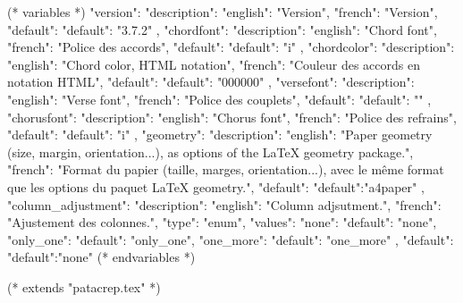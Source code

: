 %
%
%

(* variables *)
{
"version":{ "description": {"english": "Version", "french": "Version"},
            "default": {"default": "3.7.2"}
         },
"chordfont":{ "description": {"english": "Chord font",
                          "french": "Police des accords"},
            "default": {"default": "i"}
         },
"chordcolor":{ "description": {"english": "Chord color, HTML notation",
                          "french": "Couleur des accords en notation HTML"},
            "default": {"default": "000000"}
         },
"versefont":{ "description": {"english": "Verse font",
                          "french": "Police des couplets"},
            "default": {"default": ""}
         },
"chorusfont":{ "description": {"english": "Chorus font",
                          "french": "Police des refrains"},
            "default": {"default": "i"}
         },
"geometry":{ "description": {"english": "Paper geometry (size, margin, orientation...), as options of the LaTeX geometry package.",
                          "french": "Format du papier (taille, marges, orientation...), avec le même format que les options du paquet LaTeX geometry."},
            "default": {"default":"a4paper"}
         },
"column_adjustment":{ "description": {"english": "Column adjsutment.",
                          "french": "Ajustement des colonnes."},
            "type": "enum",
            "values": {"none": {"default": "none"},
                       "only_one": {"default": "only_one"},
                       "one_more": {"default": "one_more"}
                     },
            "default": {"default":"none"}
         }
}
(* endvariables *)

(* extends "patacrep.tex" *)

